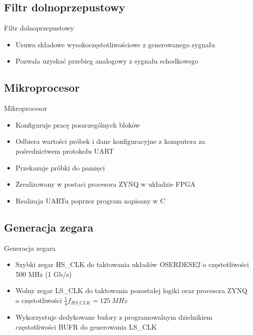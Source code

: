 \documentclass{beamer}
\begin{document}
    \subsection{Filtr dolnoprzepustowy}
    \begin{frame}{Filtr dolnoprzepustowy}
        \begin{block}{}
            \begin{itemize}
                \item Usuwa składowe wysokoczęstotliwościowe z generowanego sygnału
                \item Pozwala uzyskać przebieg analogowy z sygnału schodkowego
            \end{itemize}
        \end{block}
    \end{frame}

    \subsection{Mikroprocesor}
    \begin{frame}{Mikroprocesor}
        \begin{block}{}
            \begin{itemize}
                \item Konfiguruje pracę poszczególnych bloków
                \item Odbiera wartości próbek i dane konfiguracyjne z komputera za pośrednictwem protokołu UART
                \item Przekazuje próbki do pamięci
                \item Zrealizowany w postaci procesora ZYNQ w układzie FPGA
                \item Realizaja UARTu poprzez program napisany w C
            \end{itemize}
        \end{block}
    \end{frame}

    \subsection{Generacja zegara}
    \begin{frame}{Generacja zegara}
        \begin{block}{}
            \begin{itemize}
                \item Szybki zegar HS\_CLK do taktowania układów OSERDESE2 o częstotliwości 500 MHz (1 Gb/s)
                \item Wolny zegar LS\_CLK do taktowania pozostałej logiki oraz procesora ZYNQ o częstotliwości $\frac{1}{4} f_{HS\_CLK} = 125\ MHz$
                \item Wykorzystuje dedykowane bufory z programowalnym dzielnikiem częstotliwości BUFR do generowania LS\_CLK
            \end{itemize}
        \end{block}
    \end{frame}
\end{document}
